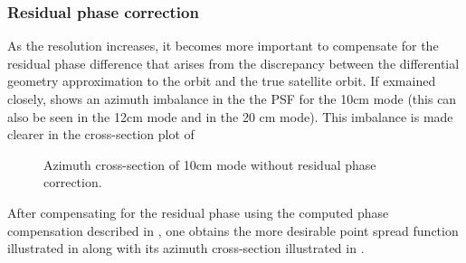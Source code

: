 \subsubsection{Residual phase correction}
As the resolution increases, it becomes more important to compensate for the residual phase difference that arises from the discrepancy between the differential geometry approximation to the orbit and the true satellite orbit. If exmained closely,  shows an azimuth imbalance in the the PSF for the 10cm mode (this can also be seen in the 12cm mode and in the 20 cm mode). This imbalance is made clearer in the cross-section plot of 
\begin{figure}[ht!]
\begin{center}
 \caption{Azimuth cross-section of 10cm mode without residual phase correction.}
 \label{fg:azimuthCross10Unbalanced}
 \end{center}
\end{figure}
After compensating for the residual phase using the computed phase compensation described in , one obtains the more desirable point spread function illustrated in  along with its azimuth cross-section illustrated in .
